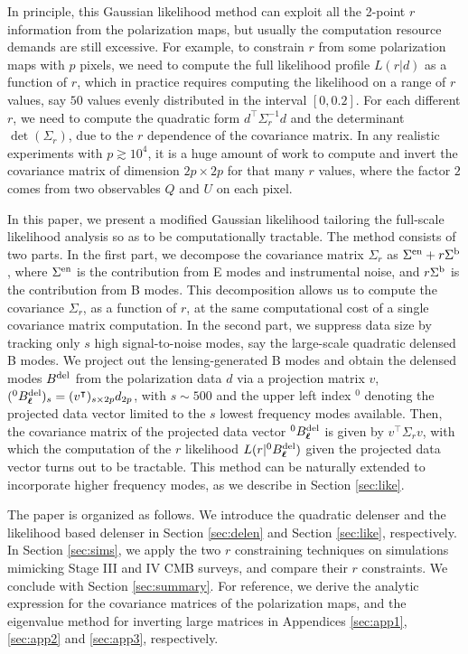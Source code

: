 \documentclass[iop,apj, numberedappendix]{emulateapj}
\newcommand*\Bell{\ensuremath{\boldsymbol\ell}}
\begin{document}
In principle, this Gaussian likelihood method can exploit
all the 2-point $r$ information from the polarization maps,
but usually the computation resource demands are still excessive. For example,
to constrain $r$ from some polarization maps with $p$ pixels,
we need to compute the full likelihood profile $L(r|d)$ as a function of $r$,
which in practice requires computing the likelihood on a range of $r$ values,
say $50$  values evenly distributed in the interval $[0, 0.2]$.
For each different $r$, we need to compute the quadratic form $d^\intercal\Sigma_r^{-1} d$ and
the determinant $\det(\Sigma_r)$, due to the $r$ dependence of the covariance matrix.
In any realistic experiments with $p \gtrsim 10^4$,
it is a huge amount of work to compute and invert the covariance matrix of dimension $2p\times 2p$
for that many $r$ values, where the factor $2$ comes from two observables $Q$ and $U$ on each pixel.

In this paper, we present a modified Gaussian likelihood tailoring
the full-scale likelihood analysis so as to be computationally tractable.
The method consists of two parts.
In the first part, we decompose the covariance matrix $\Sigma_r$ as $\Sigma^{\rm en}+ r\Sigma^{\rm b}$,
where $\Sigma^{\rm en}$ is the contribution from E modes and instrumental noise,
and $r\Sigma^{\rm b}$ is the contribution from B modes. This decomposition allows us to compute
the covariance $\Sigma_r$, as a function of $r$,
at the same computational cost of a single covariance matrix computation.
In the second part, we suppress data size by tracking only $s$
high signal-to-noise modes, say the large-scale quadratic delensed B modes.
We project out the lensing-generated B modes and obtain the delensed modes $B^{\rm del}$
from the polarization data $d$ via a projection matrix $v$,
$(^0B^{\rm del}_{\Bell})_s = (v^\intercal)_{s\times 2p} d_{2p}$,
with $s\sim 500$ and the upper left index $^0$ denoting the projected data vector
limited to the $s$ lowest frequency  modes available.
Then, the covariance matrix of the projected data vector  $^0B^{\rm del}_{\Bell}$
is given by $v^\intercal \Sigma_r v$,
with which the computation of the $r$ likelihood  $L(r|^0B^{\rm del}_{\Bell} )$
given the projected data vector turns out to be tractable.
This method can be naturally extended to incorporate higher frequency modes,
as we describe in Section \ref{sec:like}.


The paper is organized as follows. We introduce the quadratic delenser
and the likelihood based delenser in Section \ref{sec:delen} and Section \ref{sec:like}, respectively.
In Section \ref{sec:sims}, we apply the two $r$ constraining techniques
on simulations mimicking Stage III and IV CMB surveys,
and compare their $r$ constraints.
We conclude with Section \ref{sec:summary}. For reference, we derive the analytic expression
for the covariance matrices of the polarization maps, and the eigenvalue method for inverting large matrices
in Appendices \ref{sec:app1}, \ref{sec:app2} and \ref{sec:app3}, respectively.
\end{document}
